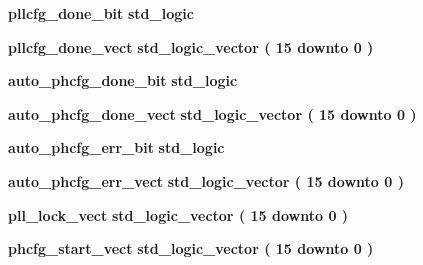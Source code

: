\begin{DoxyCompactItemize}
\item 
{\bf pllcfg\+\_\+done\+\_\+bit} {\bfseries \textcolor{comment}{std\+\_\+logic}\textcolor{vhdlchar}{ }} 
\item 
{\bf pllcfg\+\_\+done\+\_\+vect} {\bfseries \textcolor{comment}{std\+\_\+logic\+\_\+vector}\textcolor{vhdlchar}{ }\textcolor{vhdlchar}{(}\textcolor{vhdlchar}{ }\textcolor{vhdlchar}{ } \textcolor{vhdldigit}{15} \textcolor{vhdlchar}{ }\textcolor{keywordflow}{downto}\textcolor{vhdlchar}{ }\textcolor{vhdlchar}{ } \textcolor{vhdldigit}{0} \textcolor{vhdlchar}{ }\textcolor{vhdlchar}{)}\textcolor{vhdlchar}{ }} 
\item 
{\bf auto\+\_\+phcfg\+\_\+done\+\_\+bit} {\bfseries \textcolor{comment}{std\+\_\+logic}\textcolor{vhdlchar}{ }} 
\item 
{\bf auto\+\_\+phcfg\+\_\+done\+\_\+vect} {\bfseries \textcolor{comment}{std\+\_\+logic\+\_\+vector}\textcolor{vhdlchar}{ }\textcolor{vhdlchar}{(}\textcolor{vhdlchar}{ }\textcolor{vhdlchar}{ } \textcolor{vhdldigit}{15} \textcolor{vhdlchar}{ }\textcolor{keywordflow}{downto}\textcolor{vhdlchar}{ }\textcolor{vhdlchar}{ } \textcolor{vhdldigit}{0} \textcolor{vhdlchar}{ }\textcolor{vhdlchar}{)}\textcolor{vhdlchar}{ }} 
\item 
{\bf auto\+\_\+phcfg\+\_\+err\+\_\+bit} {\bfseries \textcolor{comment}{std\+\_\+logic}\textcolor{vhdlchar}{ }} 
\item 
{\bf auto\+\_\+phcfg\+\_\+err\+\_\+vect} {\bfseries \textcolor{comment}{std\+\_\+logic\+\_\+vector}\textcolor{vhdlchar}{ }\textcolor{vhdlchar}{(}\textcolor{vhdlchar}{ }\textcolor{vhdlchar}{ } \textcolor{vhdldigit}{15} \textcolor{vhdlchar}{ }\textcolor{keywordflow}{downto}\textcolor{vhdlchar}{ }\textcolor{vhdlchar}{ } \textcolor{vhdldigit}{0} \textcolor{vhdlchar}{ }\textcolor{vhdlchar}{)}\textcolor{vhdlchar}{ }} 
\item 
{\bf pll\+\_\+lock\+\_\+vect} {\bfseries \textcolor{comment}{std\+\_\+logic\+\_\+vector}\textcolor{vhdlchar}{ }\textcolor{vhdlchar}{(}\textcolor{vhdlchar}{ }\textcolor{vhdlchar}{ } \textcolor{vhdldigit}{15} \textcolor{vhdlchar}{ }\textcolor{keywordflow}{downto}\textcolor{vhdlchar}{ }\textcolor{vhdlchar}{ } \textcolor{vhdldigit}{0} \textcolor{vhdlchar}{ }\textcolor{vhdlchar}{)}\textcolor{vhdlchar}{ }} 
\item 
{\bf phcfg\+\_\+start\+\_\+vect} {\bfseries \textcolor{comment}{std\+\_\+logic\+\_\+vector}\textcolor{vhdlchar}{ }\textcolor{vhdlchar}{(}\textcolor{vhdlchar}{ }\textcolor{vhdlchar}{ } \textcolor{vhdldigit}{15} \textcolor{vhdlchar}{ }\textcolor{keywordflow}{downto}\textcolor{vhdlchar}{ }\textcolor{vhdlchar}{ } \textcolor{vhdldigit}{0} \textcolor{vhdlchar}{ }\textcolor{vhdlchar}{)}\textcolor{vhdlchar}{ }} 

\end{DoxyCompactItemize}
